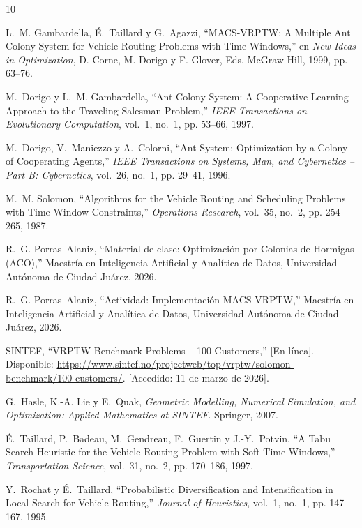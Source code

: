 \documentclass[12pt, letterpaper]{article}
\begin{document}
\begin{thebibliography}{10}

L.~M. Gambardella, É.~Taillard y G.~Agazzi,
``MACS-VRPTW: A Multiple Ant Colony System for Vehicle Routing Problems with Time Windows,''
en \textit{New Ideas in Optimization}, D. Corne, M. Dorigo y F. Glover, Eds.
McGraw-Hill, 1999, pp. 63--76.

M.~Dorigo y L.~M. Gambardella,
``Ant Colony System: A Cooperative Learning Approach to the Traveling Salesman Problem,''
\textit{IEEE Transactions on Evolutionary Computation}, vol.~1, no.~1, pp. 53--66, 1997.

M.~Dorigo, V.~Maniezzo y A.~Colorni,
``Ant System: Optimization by a Colony of Cooperating Agents,''
\textit{IEEE Transactions on Systems, Man, and Cybernetics -- Part B: Cybernetics}, vol.~26, no.~1, pp. 29--41, 1996.

M.~M. Solomon,
``Algorithms for the Vehicle Routing and Scheduling Problems with Time Window Constraints,''
\textit{Operations Research}, vol.~35, no.~2, pp. 254--265, 1987.

R.~G. Porras~Alaniz,
``Material de clase: Optimización por Colonias de Hormigas (ACO),''
Maestría en Inteligencia Artificial y Analítica de Datos, Universidad Autónoma de Ciudad Juárez, 2026.

R.~G. Porras~Alaniz,
``Actividad: Implementación MACS-VRPTW,''
Maestría en Inteligencia Artificial y Analítica de Datos, Universidad Autónoma de Ciudad Juárez, 2026.

SINTEF, ``VRPTW Benchmark Problems -- 100 Customers,'' [En línea]. Disponible: \url{https://www.sintef.no/projectweb/top/vrptw/solomon-benchmark/100-customers/}. [Accedido: 11 de marzo de 2026].

G.~Hasle, K.-A. Lie y E.~Quak,
\textit{Geometric Modelling, Numerical Simulation, and Optimization: Applied Mathematics at SINTEF}.
Springer, 2007.

É.~Taillard, P.~Badeau, M.~Gendreau, F.~Guertin y J.-Y.~Potvin,
``A Tabu Search Heuristic for the Vehicle Routing Problem with Soft Time Windows,''
\textit{Transportation Science}, vol.~31, no.~2, pp. 170--186, 1997.

Y.~Rochat y É.~Taillard,
``Probabilistic Diversification and Intensification in Local Search for Vehicle Routing,''
\textit{Journal of Heuristics}, vol.~1, no.~1, pp. 147--167, 1995.

\end{thebibliography}
\end{document}
